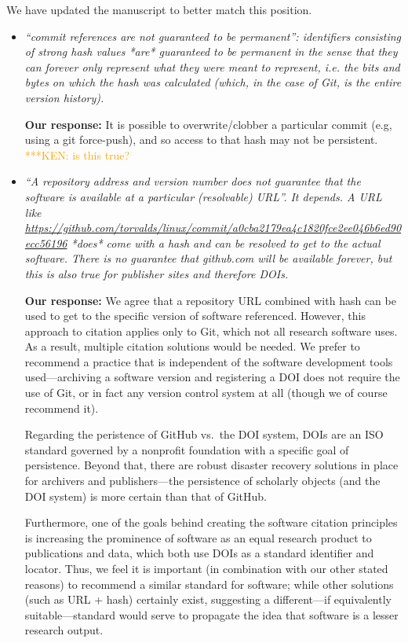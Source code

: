 \documentclass{article}
\newcommand{\niemnote}[1]{ {\textcolor{orange} { ***KEN: #1 }}} %
\begin{document}
\begin{enumerate}
We have updated the manuscript to better match this position.

\begin{itemize}

\item \emph{``commit references are not guaranteed to be permanent'':
identifiers consisting of strong hash values *are* guaranteed to be permanent
in the sense that they can forever only represent what they were meant to
represent, i.e. the bits and bytes on which the hash was calculated (which, in
the case of Git, is the entire version history).}

\textbf{Our response:}
It is possible to overwrite\slash clobber a particular commit (e.g, using a
git force-push), and so access to that hash may not be persistent.\niemnote{is this true?}

\item \emph{``A repository address and version number does not guarantee that
the software is available at a particular (resolvable) URL''. It depends. A URL
like \url{https://github.com/torvalds/linux/commit/a0cba2179ea4c1820fce2ee046b6ed90ecc56196}
*does* come with a hash and can be resolved to get to the actual software.
There is no guarantee that github.com will be available forever, but this is
also true for publisher sites and therefore DOIs.}

\textbf{Our response:}
We agree that a repository URL combined with hash can be used to get to
the specific version of software referenced. However, this approach to citation
applies only to Git, which not all research software uses. As a result, multiple
citation solutions would be needed. We prefer to recommend a practice that is
independent of the software development tools used---archiving a software
version and registering a DOI does not require the use of Git, or in fact any
version control system at all (though we of course recommend it).

Regarding the peristence of GitHub vs.\ the DOI system, DOIs are an ISO standard
governed by a nonprofit foundation with a specific goal of persistence. Beyond
that, there are robust disaster recovery solutions in place for archivers and
publishers---the persistence of scholarly objects (and the DOI system) is
more certain than that of GitHub.

Furthermore, one of the goals behind creating the software citation principles
is increasing the prominence of software as an equal research product to
publications and data, which both use DOIs as a standard identifier and locator.
Thus, we feel it is important (in combination with our other stated reasons) to
recommend a similar standard for software; while other solutions (such as URL +
hash) certainly exist, suggesting a different---if equivalently suitable---standard
would serve to propagate the idea that software is a lesser research output.


\end{itemize}
\end{enumerate}
\end{document}
